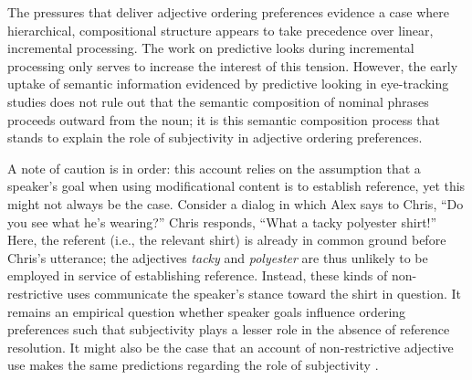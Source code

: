 \documentclass{sp}
\newcommand{\jd}[1]{\textcolor{Blue}{[jd: #1]}}
\newcommand{\gcs}[1]{\textcolor{blue}{[gcs: #1]}}
\begin{document}
The pressures that deliver adjective ordering preferences evidence a case where hierarchical, compositional structure appears to take precedence over linear, incremental processing. The work on predictive looks during incremental processing only serves to increase the interest of this tension. However, the early uptake of semantic information evidenced by predictive looking in eye-tracking studies does not rule out that the semantic composition of nominal phrases proceeds outward from the noun; it is this semantic composition process that stands to explain the role of subjectivity in adjective ordering preferences. 


A note of caution is in order: this account relies on the assumption that a speaker's goal when using modificational content is to establish reference, yet this might not always be the case.  Consider a dialog in which Alex says to Chris, ``Do you see what he's wearing?'' Chris responds, ``What a tacky polyester shirt!'' Here, the referent (i.e., the relevant shirt) is already in common ground before Chris's utterance; the adjectives \emph{tacky} and \emph{polyester} are thus unlikely to be employed in  service of establishing reference. Instead, these kinds of non-restrictive uses communicate the speaker's stance toward the shirt in question. It remains an empirical question whether speaker goals influence ordering preferences such that subjectivity plays a lesser role in the absence of reference resolution. It might also be the case that an account of non-restrictive adjective use makes the same predictions regarding the role of subjectivity \citep[cf.][]{hahnetal2018}. %
\end{document}
